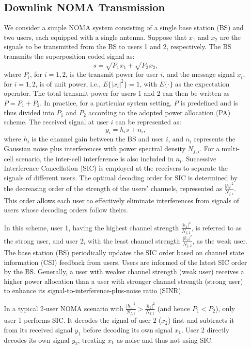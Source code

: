 \subsection{Downlink NOMA Transmission}
We consider a simple NOMA system consisting of a single base station (BS) and two users, each equipped with a single antenna. Suppose that $x_1$ and $x_2$ are the signals to be transmitted from the BS to users 1 and 2, respectively. The BS transmits the superposition coded signal as:
\[
s = \sqrt{P_1} x_1 + \sqrt{P_2} x_2, 
\tag{2.3}\]
where $P_i$, for $i = 1, 2$, is the transmit power for user $i$, and the message signal $x_i$, for $i = 1, 2$, is of unit power, i.e., $E\{|x_i|^2\} = 1$, with $E\{\cdot\}$ as the expectation operator. The total transmit power for users 1 and 2 can then be written as $P = P_1 + P_2$. In practice, for a particular system setting, $P$ is predefined and is thus divided into $P_1$ and $P_2$ according to the adopted power allocation (PA) scheme. The received signal at user $i$ can be represented as:
\[
y_i = h_i s + n_i, \tag{2.4}
\]
where $h_i$ is the channel gain between the BS and user $i$, and $n_i$ represents the Gaussian noise plus interferences with power spectral density $N_{f,i}$. For a multi-cell scenario, the inter-cell interference is also included in $n_i$.
Successive Interference Cancellation (SIC) is employed at the receivers to separate the signals of different users. The optimal decoding order for SIC is determined by the decreasing order of the strength of the users' channels, represented as $\frac{|h_i|^2}{N_{f,i}}$. This order allows each user to effectively eliminate interferences from signals of users whose decoding orders follow theirs. 

In this scheme, user 1, having the highest channel strength $\frac{|h_1|^2}{N_{f,1}}$, is referred to as the strong user, and user 2, with the least channel strength $\frac{|h_2|^2}{N_{f,2}}$, as the weak user. The base station (BS) periodically updates the SIC order based on channel state information (CSI) feedback from users. Users are informed of the latest SIC order by the BS. Generally, a user with weaker channel strength (weak user) receives a higher power allocation than a user with stronger channel strength (strong user) to enhance its signal-to-interference-plus-noise ratio (SINR).

In a typical 2-user NOMA scenario with $\frac{|h_1|^2}{N_{f,1}} > \frac{|h_2|^2}{N_{f,2}}$ (and hence $P_1 < P_2$), only user 1 performs SIC. It decodes the signal of user 2 ($x_2$) first and subtracts it from its received signal $y_1$ before decoding its own signal $x_1$. User 2 directly decodes its own signal $y_2$, treating $x_1$ as noise and thus not using SIC. 

